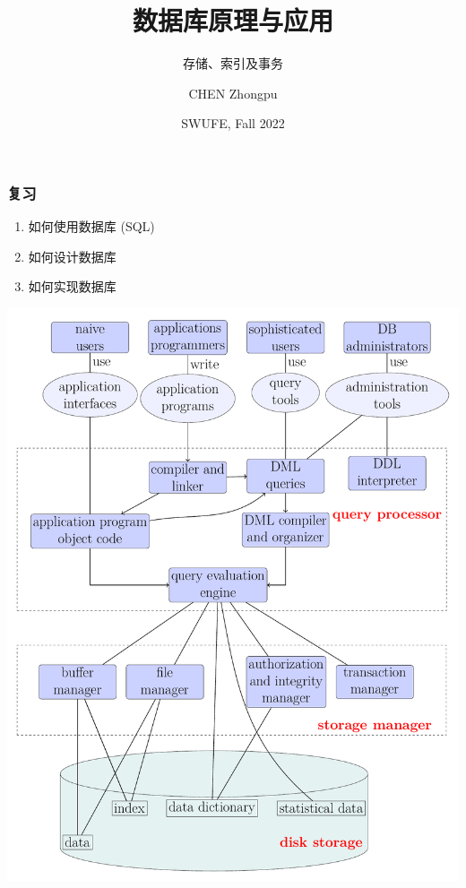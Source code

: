 \documentclass[aspectratio=169, 14pt]{beamer}
\title[Database Principles and Applications] %
{数据库原理与应用}
\subtitle{存储、索引及事务}
\author[CHEN Zhongpu] %
{CHEN Zhongpu}
\institute[] %
{
  School of Computing and Artificial Intelligence \\
  \href{mailto:zpchen@swufe.edu.cn}{zpchen@swufe.edu.cn}
}
\date[] %
{SWUFE, Fall 2022}
\begin{document}
\frame{\titlepage}

\begin{frame}
    \frametitle{复习}
    \begin{center}
        \LARGE {}
    \end{center}
    \begin{enumerate}
        \item 如何使用数据库 (SQL)
        \item 如何设计数据库
        \item \alert{如何实现数据库}
    \end{enumerate}

\end{frame}

\begin{frame}[fragile]
    \begin{center}
        \includegraphics[height=.99\paperheight]{image/system}
    \end{center}
\end{frame}
\end{document}
